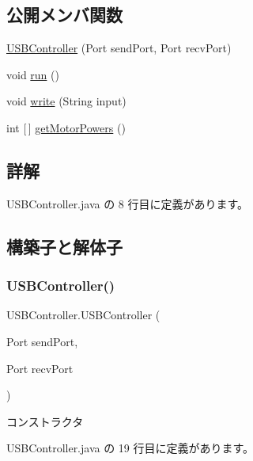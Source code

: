 \subsection*{公開メンバ関数}
\begin{DoxyCompactItemize}
\item 
\mbox{\hyperlink{class_u_s_b_controller_a66b64f29e68b4e068f0ba57a8c544782}{U\+S\+B\+Controller}} (Port send\+Port, Port recv\+Port)
\item 
void \mbox{\hyperlink{class_u_s_b_controller_a3764a01faaee1b82985a787c44a4dab1}{run}} ()
\item 
void \mbox{\hyperlink{class_u_s_b_controller_afe8a9c9fdb005132410e327153c984f4}{write}} (String input)
\item 
int \mbox{[}$\,$\mbox{]} \mbox{\hyperlink{class_u_s_b_controller_abd4b47f1e86159dfd7ab01ad28f21b40}{get\+Motor\+Powers}} ()
\end{DoxyCompactItemize}


\subsection{詳解}


 U\+S\+B\+Controller.\+java の 8 行目に定義があります。



\subsection{構築子と解体子}
\mbox{\label{class_u_s_b_controller_a66b64f29e68b4e068f0ba57a8c544782}} 
\subsubsection{\texorpdfstring{USBController()}{USBController()}}
{\footnotesize\ttfamily U\+S\+B\+Controller.\+U\+S\+B\+Controller (\begin{DoxyParamCaption}\item[{Port}]{send\+Port,  }\item[{Port}]{recv\+Port }\end{DoxyParamCaption})\hspace{0.3cm}{\ttfamily [inline]}}

コンストラクタ 

 U\+S\+B\+Controller.\+java の 19 行目に定義があります。



